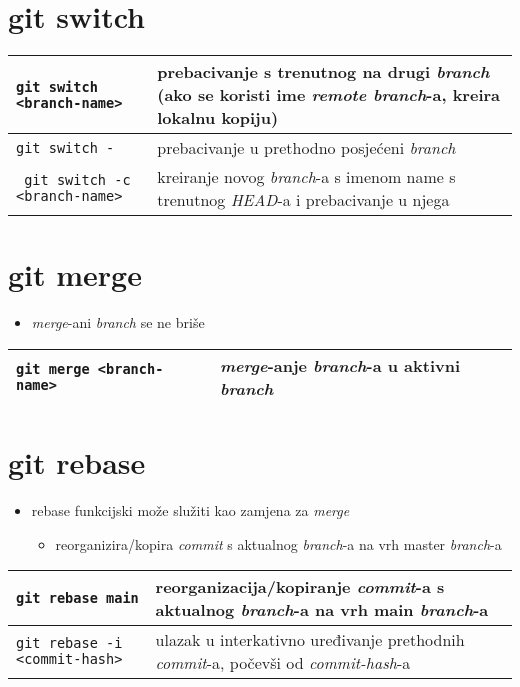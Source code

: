 \documentclass[10pt]{article}
\begin{document}
    \section*{git switch}
    \begin{tabular}{|>{\tt}p{9.00cm}|>{}p{15.50cm}|}
        \hline
        git switch <branch-name>                        & prebacivanje s trenutnog na drugi \textit{branch} (ako se koristi ime \textit{remote branch}-a, kreira lokalnu kopiju) \\ \hline
        git switch -                                    & prebacivanje u prethodno posjećeni \textit{branch} \\ \hline
        git switch -c <branch-name>                     & kreiranje novog \textit{branch}-a s imenom name s trenutnog \textit{HEAD}-a i prebacivanje u njega \\ \hline
    \end{tabular}

    \section*{git merge}
    \begin{itemize}
        \item \textit{merge}-ani \textit{branch} se ne briše
    \end{itemize}
    \begin{tabular}{|>{\tt}p{9.00cm}|>{}p{15.50cm}|}
        \hline
        git merge <branch-name>                         & \textit{merge}-anje \textit{branch}-a u aktivni \textit{branch} \\ \hline
    \end{tabular}

    \section*{git rebase}
    \begin{itemize}
        \item rebase funkcijski može služiti kao zamjena za \textit{merge}
        \begin{itemize}
            \item reorganizira/kopira \textit{commit} s aktualnog \textit{branch}-a na vrh master \textit{branch}-a
        \end{itemize}
    \end{itemize}
    \begin{tabular}{|>{\tt}p{9.00cm}|>{}p{15.50cm}|}
        \hline
        git rebase main                                 & reorganizacija/kopiranje \textit{commit}-a s aktualnog \textit{branch}-a na vrh main \textit{branch}-a \\ \hline
        git rebase -i <commit-hash>                     & ulazak u interkativno uređivanje prethodnih \textit{commit}-a, počevši od \textit{commit-hash}-a \\ \hline
    \end{tabular}
\end{document}

